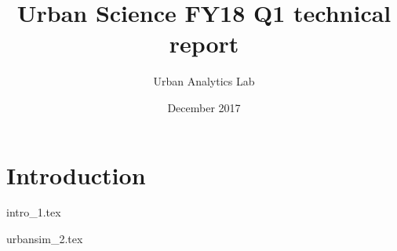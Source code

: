 \documentclass[onecolumn,10pt]{IEEEtran}
\title{Urban Science FY18 Q1 technical report}
\author{Urban Analytics Lab}
\date{December 2017}
\begin{document}
\maketitle
\begin{abstract}

\end{abstract}

\section{Introduction}
{intro_1.tex}

{urbansim_2.tex}




\end{document}
